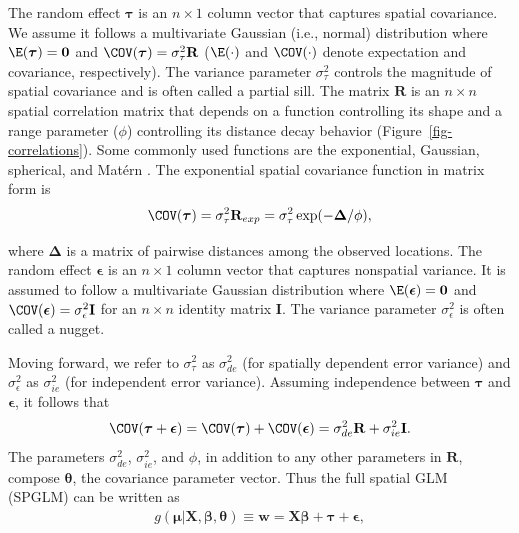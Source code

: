 \documentclass[
]{jss}
\begin{document}
The random effect \(\boldsymbol{\tau}\) is an \(n \times 1\) column
vector that captures spatial covariance. We assume it follows a
multivariate Gaussian (i.e., normal) distribution where
\(\E(\boldsymbol{\tau}) = \boldsymbol{0}\) and
\(\COV(\boldsymbol{\tau}) = \sigma^2_\tau \mathbf{R}\) (\(\E(\cdot)\)
and \(\COV(\cdot)\) denote expectation and covariance, respectively).
The variance parameter \(\sigma^2_\tau\) controls the magnitude of
spatial covariance and is often called a partial sill. The matrix
\(\mathbf{R}\) is an \(n \times n\) spatial correlation matrix that
depends on a function controlling its shape and a range parameter
(\(\phi\)) controlling its distance decay behavior
(Figure~\ref{fig-correlations}). Some commonly used functions are the
exponential, Gaussian, spherical, and Matérn
\citep{chiles2012geostatistics}. The exponential spatial covariance
function in matrix form is \begin{align}\label{eq-spcov-exp}
  \COV(\boldsymbol{\tau}) = \sigma^2_{\tau} \mathbf{R}_{exp} =  \sigma^2_{\tau} \exp(-\boldsymbol \Delta/\phi),
\end{align}

where \(\boldsymbol \Delta\) is a matrix of pairwise distances among the
observed locations. The random effect \(\boldsymbol{\epsilon}\) is an
\(n \times 1\) column vector that captures nonspatial variance. It is
assumed to follow a multivariate Gaussian distribution where
\(\E(\boldsymbol{\epsilon}) = \boldsymbol{0}\) and
\(\COV(\boldsymbol{\epsilon}) = \sigma^2_\epsilon \mathbf{I}\) for an
\(n \times n\) identity matrix \(\mathbf{I}\). The variance parameter
\(\sigma^2_\epsilon\) is often called a nugget.

Moving forward, we refer to \(\sigma^2_{\tau}\) as \(\sigma^2_{de}\)
(for spatially dependent error variance) and \(\sigma^2_{\epsilon}\) as
\(\sigma^2_{ie}\) (for independent error variance). Assuming
independence between \(\boldsymbol{\tau}\) and
\(\boldsymbol{\epsilon}\), it follows that \begin{align}\label{eq-spcov}
 \COV(\boldsymbol{\tau} + \boldsymbol{\epsilon}) = \COV(\boldsymbol{\tau}) + \COV(\boldsymbol{\epsilon}) = \sigma^2_{de}\mathbf{R} + \sigma^2_{ie} \mathbf{I}.
\end{align} The parameters \(\sigma^2_{de}\), \(\sigma^2_{ie}\), and
\(\phi\), in addition to any other parameters in \(\mathbf{R}\), compose
\(\boldsymbol{\theta}\), the covariance parameter vector. Thus the full
spatial GLM (SPGLM) can be written as \begin{align}\label{eq-spglm}
g(\boldsymbol{\mu}|\mathbf{X}, \boldsymbol{\beta}, \boldsymbol{\theta}) \equiv \mathbf{w} = \mathbf{X} \boldsymbol{\beta} + \boldsymbol{\tau} + \boldsymbol{\epsilon},
\end{align}
\end{document}
